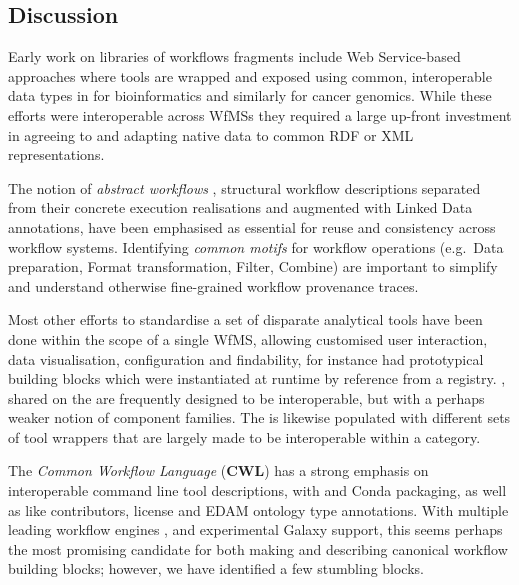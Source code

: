 \subsection{Discussion}\label{ch6:discussion}

Early work on libraries of workflows fragments include Web Service-based approaches where tools are wrapped and exposed using common, interoperable data types in  \cite{BioMoby 2008} for bioinformatics and similarly  \cite{Saltz 2006} for cancer genomics.
While these efforts were interoperable across WfMSs they required a large up-front investment in agreeing to and adapting native data to common RDF or XML representations.

The notion of \emph{abstract workflows} \cite{Garijo 2011}, structural workflow descriptions separated from their concrete execution realisations and augmented with Linked Data annotations, have been emphasised as essential for reuse and consistency across workflow systems.
Identifying \emph{common motifs} for workflow operations \cite{Garijo 2014a} (e.g.~Data preparation, Format transformation, Filter, Combine) are important to simplify and understand otherwise fine-grained workflow provenance traces.

Most other efforts to standardise a set of disparate analytical tools have been done within the scope of a single WfMS, allowing customised user interaction, data visualisation, configuration and findability, for instance  had prototypical building blocks \cite{De Giovanni 2016} which were instantiated at runtime by reference from a registry. 
, shared on the  are frequently designed to be interoperable, but with a perhaps weaker notion of component families.
The  \cite{Blankenberg 2014} is likewise populated with different sets of tool wrappers that are largely made to be interoperable within a category.

The \emph{Common Workflow Language} (\textbf{CWL}) \cite{Crusoe 2022} has a strong emphasis on interoperable command line tool descriptions, with  and Conda packaging, as well as  like contributors, license and EDAM ontology type annotations.
With multiple leading workflow engines , and experimental Galaxy support, this seems perhaps the most promising candidate for both making and describing canonical workflow building blocks; however, we have identified a few stumbling blocks.

